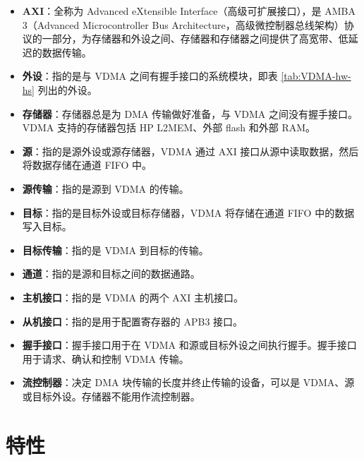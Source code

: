 \documentclass[main\_\_CN.tex]{subfiles}
\begin{document}
\begin{itemize}
    \item \textbf{AXI}：全称为 Advanced eXtensible Interface（高级可扩展接口），是 AMBA 3（Advanced Microcontroller Bus Architecture，高级微控制器总线架构）协议的一部分，为存储器和外设之间、存储器和存储器之间提供了高宽带、低延迟的数据传输。

    \item \textbf{外设}：指的是与 VDMA 之间有握手接口的系统模块，即表 \ref{tab:VDMA-hw-hs} 列出的外设。

    \item \textbf{存储器}：存储器总是为 DMA 传输做好准备，与 VDMA 之间没有握手接口。VDMA 支持的存储器包括 HP L2MEM、外部 flash 和外部 RAM。

    \item \textbf{源}：指的是源外设或源存储器，VDMA 通过 AXI 接口从源中读取数据，然后将数据存储在通道 FIFO 中。

    \item \textbf{源传输}：指的是源到 VDMA 的传输。

    \item \textbf{目标}：指的是目标外设或目标存储器，VDMA 将存储在通道 FIFO 中的数据写入目标。

    \item \textbf{目标传输}：指的是 VDMA 到目标的传输。

    \item \textbf{通道}：指的是源和目标之间的数据通路。

    \item \textbf{主机接口}：指的是 VDMA 的两个 AXI 主机接口。

    \item \textbf{从机接口}：指的是用于配置寄存器的 APB3 接口。

    \item \textbf{握手接口}：握手接口用于在 VDMA 和源或目标外设之间执行握手。握手接口用于请求、确认和控制 VDMA 传输。
    \item \textbf{流控制器}：决定 DMA 块传输的长度并终止传输的设备，可以是 VDMA、源或目标外设。存储器不能用作流控制器。

\end{itemize}


\section{特性}
\end{document}
